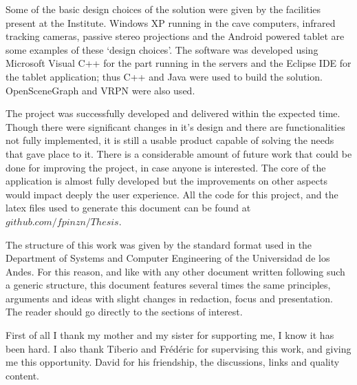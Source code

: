 Some of the basic design choices of the solution were given by the facilities present at the Institute. Windows XP running in the cave computers, infrared tracking cameras, passive stereo projections and the Android powered tablet are some examples of these `design choices'. The software was developed using Microsoft Visual C++ for the part running in the servers and the Eclipse IDE for the tablet application; thus C++ and Java were used to build the solution. OpenSceneGraph and VRPN were also used.


The project was successfully developed and delivered within the expected time. Though there were significant changes in it's design and there are functionalities not fully implemented, it is still a usable product capable of solving the needs that gave place to it. There is a considerable amount of future work that could be done for improving the project, in case anyone is interested. The core of the application is almost fully developed but the improvements on other aspects would impact deeply the user experience. All the code for this project, and the latex files used to generate this document can be found at $github.com/fpinzn/Thesis$.

The structure of this work was given by the standard format used in the Department of Systems and Computer Engineering of the Universidad de los Andes. For this reason, and like with any other document written following such a generic structure, this document features several times the same principles, arguments and ideas with slight changes in redaction, focus and presentation. The reader should go directly to the sections of interest.

First of all I thank my mother and my sister for supporting me, I know it has been hard. I also thank Tiberio and Frédéric for supervising this work, and giving me this opportunity. David for his friendship, the discussions, links and quality content.